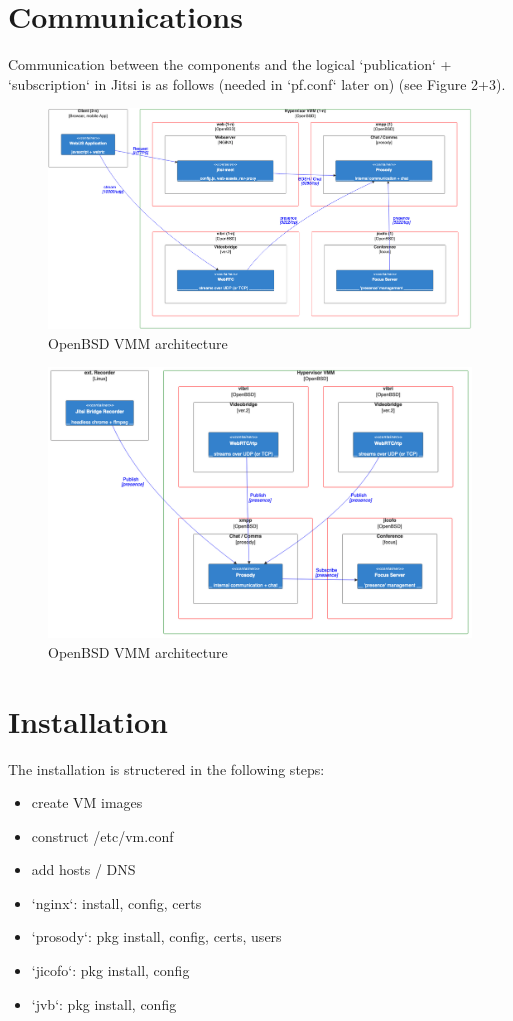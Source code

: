 \documentclass[10pt,conference]{IEEEtran}
\begin{document}
\section{Communications}
Communication between the components and the logical `publication` + `subscription` in Jitsi
is as follows (needed in `pf.conf` later on) (see Figure 2+3).
\begin{figure}
    \centering
    \includegraphics[width=16cm]{img/arch-tcp.png}
    \caption{\textsf{OpenBSD VMM architecture}}
\end{figure}
\begin{figure}
    \centering
    \includegraphics[width=16cm]{img/arch-pubsub.png}
    \caption{\textsf{OpenBSD VMM architecture}}
\end{figure}

\section{Installation}
The installation is structered in the following steps:
\begin{itemize}
\item create VM images
\item construct /etc/vm.conf
\item add hosts / DNS
\item `nginx`: install, config, certs
\item `prosody`: pkg install, config, certs, users
\item `jicofo`: pkg install, config
\item `jvb`: pkg install, config
\end{itemize}
\end{document}
